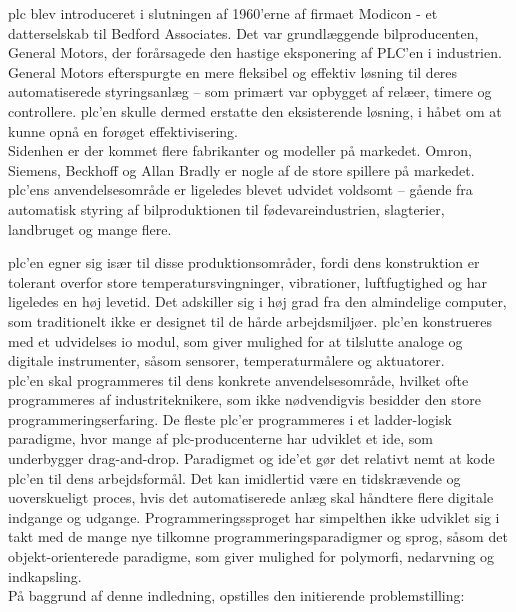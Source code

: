 \gls{plc} blev introduceret i slutningen af 1960'erne af firmaet Modicon - et datterselskab til Bedford Associates. Det var grundlæggende bilproducenten, General Motors, der forårsagede den hastige eksponering af PLC’en i industrien. General Motors efterspurgte en mere fleksibel og effektiv løsning til deres automatiserede styringsanlæg – som primært var opbygget af relæer, timere og controllere. \gls{plc}'en skulle dermed erstatte den eksisterende løsning, i håbet om at kunne opnå en forøget effektivisering. \\

\noindent Sidenhen er der kommet flere fabrikanter og modeller på markedet. Omron, Siemens, Beckhoff og Allan Bradly er nogle af de store spillere på markedet. \gls{plc}'ens anvendelsesområde er ligeledes blevet udvidet voldsomt – gående fra automatisk styring af bilproduktionen til fødevareindustrien, slagterier, landbruget og mange flere. 

\noindent \gls{plc}'en egner sig især til disse produktionsområder, fordi dens konstruktion er tolerant overfor store temperatursvingninger, vibrationer, luftfugtighed og har ligeledes en høj levetid. Det adskiller sig i høj grad fra den almindelige computer, som traditionelt ikke er designet til de hårde arbejdsmiljøer. \gls{plc}'en konstrueres med et udvidelses \gls{io} modul, som giver mulighed for at tilslutte analoge og digitale instrumenter, såsom sensorer, temperaturmålere og aktuatorer. \\

\noindent \gls{plc}'en skal programmeres til dens konkrete anvendelsesområde, hvilket ofte programmeres af industriteknikere, som ikke nødvendigvis besidder den store programmeringserfaring. De fleste \gls{plc}'er programmeres i et ladder-logisk paradigme, hvor mange af \gls{plc}-producenterne har udviklet et \gls{ide}, som underbygger drag-and-drop. Paradigmet og \gls{ide}'et gør det relativt nemt at kode \gls{plc}'en til dens arbejdsformål. Det kan imidlertid være en tidskrævende og uoverskueligt proces, hvis det automatiserede anlæg skal håndtere flere digitale indgange og udgange. Programmeringssproget har simpelthen ikke udviklet sig i takt med de mange nye tilkomne programmeringsparadigmer og sprog, såsom det objekt-orienterede paradigme, som giver mulighed for polymorfi, nedarvning og indkapsling. \\

\noindent På baggrund af denne indledning, opstilles den initierende problemstilling: \\

